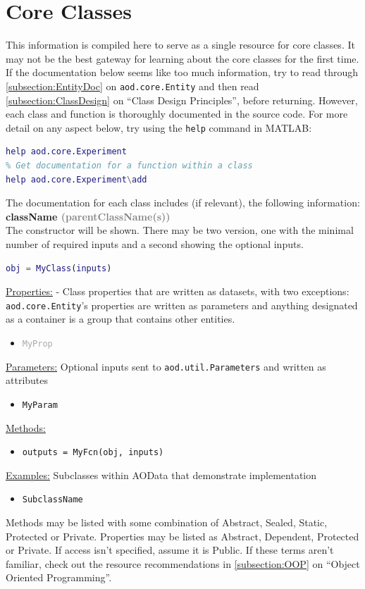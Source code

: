 \documentclass[10pt]{exam}
\newcommand\myurl[1]{\textcolor{blue}{\underline{#1}}}
\newcommand\myparent[1]{\textcolor{gray}{(#1)}}
\newcommand\aodparam[1]{\textcolor{codepurple}{\texttt{#1}}}
\newcommand\aodclass[1]{\textcolor{codeblue}{\texttt{#1}}}
\newcommand\aodprop[1]{\textcolor{darkgray}{\texttt{#1}}}
\newcommand\aodfcn[1]{\textcolor{darkteal}{\texttt{#1}}}
\newcommand\matfcn[1]{\textcolor{darkteal}{\texttt{#1}}}
\newcommand\docheader[1]{\vspace{0.6ex}\noindent\underline{#1}\vspace{0.15ex}}
\begin{document}
\section{Core Classes}
	\label{section:CoreClasses}
	\noindent This information is compiled here to serve as a single resource for core classes. It may not be the best gateway for learning about the core classes for the first time. If the documentation below seems like too much information, try to read through \myurl{\ref{subsection:EntityDoc}} on \aodclass{aod.core.Entity} and then read \myurl{\ref{subsection:ClassDesign}} on ``Class Design Principles'', before returning.  However, each class and function is thoroughly documented in the source code. For more detail on any aspect below, try using the \matfcn{help} command in MATLAB:
	\begin{lstlisting}[language=matlab]
% Get documentation for a class or function
help aod.core.Experiment
% Get documentation for a function within a class
help aod.core.Experiment\add
	\end{lstlisting}
	\noindent The documentation for each class includes (if relevant), the following information:\smallskip\\
	\textbf{className \myparent{parentClassName(s)}}\smallskip\\
	The constructor will be shown. There may be two version, one with the minimal number of required inputs and a second showing the optional inputs.
	\begin{lstlisting}[language=matlab]
obj = MyClass(inputs)
	\end{lstlisting}
	\docheader{Properties:} - Class properties that are written as datasets, with two exceptions: \aodclass{aod.core.Entity}'s properties are written as parameters and anything designated as a container is a group that contains other entities. %
	\begin{itemize}
		\item \aodprop{MyProp}
	\end{itemize}
	\docheader{Parameters:} Optional inputs sent to \aodclass{aod.util.Parameters} and written as attributes
	\begin{itemize}
		\item \aodparam{MyParam}
	\end{itemize}
	\docheader{Methods:}
	\begin{itemize}
		\item \aodfcn{outputs = MyFcn(obj, inputs)}
	\end{itemize}
	\docheader{Examples:} Subclasses within AOData that demonstrate implementation
	\begin{itemize}
		\item \aodclass{SubclassName}
	\end{itemize}
	\noindent Methods may be listed with some combination of Abstract, Sealed, Static, Protected or Private. Properties may be listed as Abstract, Dependent, Protected or Private. If access isn't specified, assume it is Public. If these terms aren't familiar, check out the resource recommendations in \myurl{\ref{subsection:OOP}} on ``Object Oriented Programming''.
\end{document}
